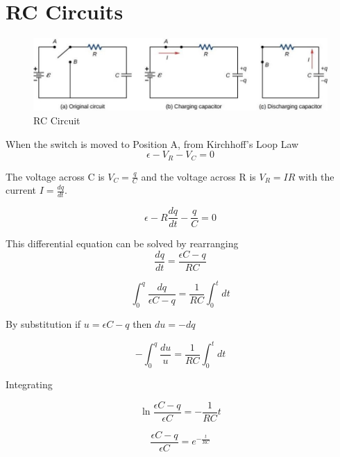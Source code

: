 \documentclass[14pt]{memoir}
\begin{document}
\section{RC Circuits}

\begin{figure}[H]
\begin{center}
\includegraphics[scale=0.50]{fig/fig_10_38.jpg}
\caption{RC Circuit}
\label{fig:10_38}
\end{center}
\end{figure}

When the switch is moved to Position A, from Kirchhoff's Loop Law
\begin{equation}
\epsilon - V_R - V_C =0
\end{equation}

The voltage across C is $V_C = \frac{q}{C}$ and the voltage across R is $V_R = IR$ with the current $I = \frac{dq}{dt}$.

\begin{equation}
\epsilon - R \frac{dq}{dt}  - \frac{q}{C} = 0
\end{equation}

This differential equation can be solved by rearranging
\begin{equation}
\frac{dq}{dt} = \frac{\epsilon C - q}{RC}
\end{equation}

\begin{equation}
\int_0^q \frac{dq}{\epsilon C - q} = \frac{1}{RC} \int_0^t dt
\end{equation}

By substitution if $u = \epsilon C - q$ then $du = -dq$

\begin{equation}
- \int_0^q \frac{du}{u} = \frac{1}{RC} \int_0^t dt
\end{equation}

Integrating

\begin{equation}
\ln{\frac{\epsilon C - q}{\epsilon C}} = - \frac{1}{RC} t
\end{equation}

\begin{equation}
\frac{\epsilon C - q}{\epsilon C} = e^{-\frac{t}{RC}}
\end{equation}
\end{document}
